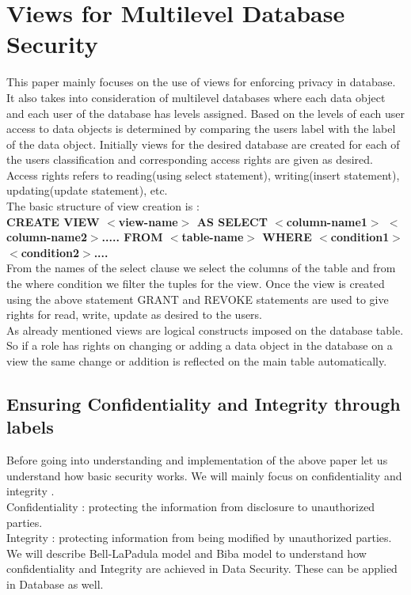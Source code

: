 \documentclass[11pt,a4paper]{report}
\begin{document}
\newpage
\section{Views for Multilevel Database Security}
This paper mainly focuses on the use of views for enforcing privacy in database. It also takes into consideration of multilevel databases where each data object and each user of the database has levels assigned. Based on the levels of each user access to data objects is determined by comparing the users label with the label of the data object.  Initially views for the desired database are created for each of the users classification and corresponding access rights are given as desired. Access rights refers to reading(using select statement), writing(insert statement), updating(update statement), etc. \\
The basic structure of view creation is :\\ 
\textbf{CREATE VIEW $<$view-name$>$ AS SELECT $<$column-name1$>$ $<$column-name2$>$..... FROM $<$table-name$>$ WHERE $<$condition1$>$ $<$condition2$>$....}\\

From the names of the select clause we select the columns of the table and from the where condition we filter the tuples for the view. Once the view is created using the above statement GRANT and REVOKE statements are used to give rights for read, write, update as desired to the users. \\

As already mentioned views are logical constructs imposed on the database table. So if a role has rights on changing or adding a data object in the database on a view the same change or addition is reflected on the main table automatically. 

\subsection{Ensuring Confidentiality and Integrity through labels}
Before going into understanding and implementation of the above paper let us understand how basic security works. We will mainly focus on confidentiality and integrity . \\
Confidentiality : protecting the information from disclosure to unauthorized parties. \\
Integrity :  protecting information from being modified by unauthorized parties.\\
We will describe Bell-LaPadula model and Biba model to understand how confidentiality and Integrity are achieved in Data Security. These can be applied in Database as well.\\  
\end{document}
